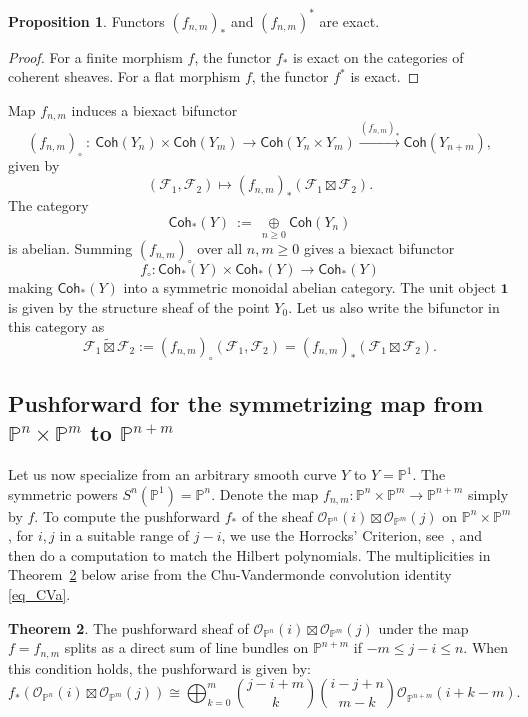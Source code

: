 \documentclass{article}
\def\lra{\longrightarrow}
\newcommand{\Coh}{\mathsf{Coh}}
\newcommand{\one}{\mathbf{1}}
\newcommand{\mcO}{\mathcal{O}}
\newcommand{\mcF}{\mathcal{F}}
\newcommand{\PP}{\mathbb{P}}
\newcommand{\oplusop}[1]{{\mathop{\oplus}\limits_{#1}}}
\theoremstyle{definition}
\newtheorem{thm}{Theorem}[section]
\newtheorem{prop}[thm]{Proposition}
\theoremstyle{definition}
\begin{document}
\begin{prop}
    Functors $(f_{n,m})_{\ast} $ and $(f_{n,m})^{\ast}$ are exact.
\end{prop}
\begin{proof}
For a finite morphism $f$, the functor $f_{\ast}$ is exact on the categories of coherent sheaves. For a flat morphism $f$, the functor $f^{\ast}$ is exact.
\end{proof}

Map $f_{n,m}$ induces a biexact bifunctor
\[
(f_{n,m})_{\circ} \ : \
\Coh(Y_n)\times \Coh(Y_m) \lra \mathsf{Coh}(Y_n\times Y_m) \stackrel{(f_{n,m})_{\ast}}{\lra}
\Coh(Y_{n+m}),
\]
given by
\[
(\mcF_1,\mcF_2)\longmapsto (f_{n,m})_{\ast}(\mcF_1\boxtimes \mcF_2).
\]
The category
\[
\Coh_{\ast}(Y) \ := \ \oplusop{n\ge 0} \Coh(Y_n)
\]
is abelian. Summing $(f_{n,m})_{\circ}$ over all $n,m\ge 0$ gives a biexact bifunctor
\[
f_{\circ} : \Coh_{\ast}(Y) \times \Coh_{\ast}(Y) \lra \Coh_{\ast}(Y)
\]
making $\Coh_{\ast}(Y)$ into a symmetric monoidal abelian category. The unit object $\one$ is given by the structure sheaf of the point $Y_0$. Let us also write the bifunctor in this category as
\begin{equation}\label{eq_tensor_prod}
\mcF_1 \widetilde{\boxtimes} \mcF_2 := (f_{n,m})_{\circ}(\mcF_1,\mcF_2) = (f_{n,m})_{\ast}(\mcF_1\boxtimes \mcF_2).
\end{equation}






\subsection{Pushforward for the symmetrizing map  from \texorpdfstring{$\PP^n\times \PP^m$}{P(n)*P(m)} to \texorpdfstring{$\PP^{n+m}$}{P(n+m)}}
\label{subsec_pushforward}

Let us now specialize from an arbitrary smooth curve $Y$ to $Y=\PP^1$. The symmetric powers $S^n(\PP^1)=\PP^n$. Denote the map $f_{n,m}:\PP^n\times \PP^m\lra \PP^{n+m}$  simply by $f$.
 To compute the pushforward $f_{\ast}$ of the sheaf $\mcO_{\PP^n}(i) \boxtimes \mcO_{\PP^m}(j)$ on $\PP^n\times \PP^m$, for $i,j$ in a suitable range of $j-i$, we use the Horrocks' Criterion, see~\cite[Theorem 2.3.1]{OSS}, and then do a computation to match the Hilbert polynomials.
The multiplicities in Theorem~\ref{thm_pushforward} below  arise from the Chu-Vandermonde convolution identity \eqref{eq_CVa}.


\begin{thm}\label{thm_pushforward} The pushforward sheaf of $\mcO_{\PP^n}(i) \boxtimes \mcO_{\PP^m}(j)$ under the map $f=f_{n,m}$ splits as a direct sum of line bundles on $\PP^{n+m}$ if  $-m \le j - i \le n$. When this condition holds, the pushforward is given by:
\begin{equation}\label{eq_f_decomposition}
f_{\ast}(\mcO_{\PP^n}(i) \boxtimes \mcO_{\PP^m}(j)) \cong \bigoplus_{k=0}^{m} \binom{j-i+m}{k} \binom{i-j+n}{m-k}\mcO_{\PP^{n+m}}(i + k - m).
\end{equation}
\end{thm}
\end{document}
